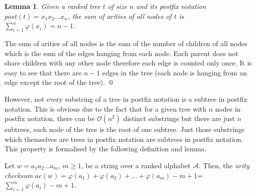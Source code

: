 \documentclass[preprint,12pt]{elsarticle}
\newtheorem{lemma}[theorem]{Lemma}
\newenvironment{proof}[1][Proof]{\begin{trivlist}
\item[\hskip \labelsep {\bfseries #1}]}{\end{trivlist}}
\newenvironment{definition}[1][Definition]{\begin{trivlist}
\item[\hskip \labelsep {\bfseries #1}]}{\end{trivlist}}
\begin{document}
\begin{lemma}\label{lem:2}
Given a ranked tree $t$ of size $n$ and its postfix notation $\textit{post}(t)=x_1 x_2 \ldots x_n$, the sum of arities of all nodes of $t$ is $\sum_{i=1}^n \varphi(x_i) = n - 1$.
\end{lemma}
\begin{proof}
The sum of arities of all nodes is the sum of the number of children of all nodes which is the sum of the edges hanging from each node. Each parent does not share children with any other node therefore each edge is counted only once. It is easy to see that there are $n-1$ edges in the tree (each node is hanging from an edge except the root of the tree).
\qed
\end{proof}

However, not every substring of a tree in postfix notation is a subtree in
postfix notation. This is obvious due to the fact that for a given tree with
$n$ nodes in postfix notation, there can be $\mathcal{O}(n^2)$ distinct
substrings but there are just $n$ subtrees, each node of the tree is the root
of one subtree. Just those substrings which themselves are trees in postfix
notation are subtrees in postfix notation. This property is
formalised by the following definition and lemma.

\begin{definition}
\label{def:5}
Let $w= a_1 a_2 \ldots a_m$, $m \geq 1$, be a string over a ranked alphabet
$\mathcal{A}$. Then, the \emph{arity checksum} $\textit{ac}(w) = 
\varphi(a_1) + \varphi(a_2)+ \ldots + \varphi(a_m)-m+1$=
$\sum_{i=1}^m \varphi(a_i) -m +1$.
\end{definition}
\end{document}
